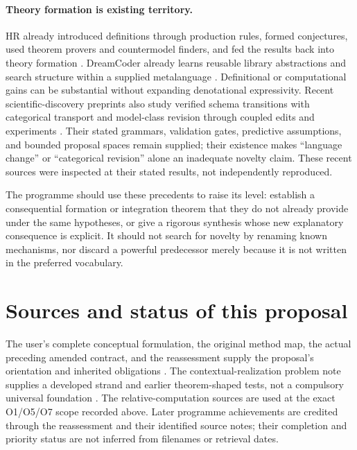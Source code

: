 \documentclass[11pt]{article}
\theoremstyle{definition}
\begin{document}
\paragraph{Theory formation is existing territory.}
HR already introduced definitions through production rules, formed conjectures, used theorem provers and countermodel finders, and fed the results back into theory formation \cite{HR}. DreamCoder already learns reusable library abstractions and search structure within a supplied metalanguage \cite{DreamCoder}. Definitional or computational gains can be substantial without expanding denotational expressivity. Recent scientific-discovery preprints also study verified schema transitions with categorical transport and model-class revision through coupled edits and experiments \cite{ScientificSchema,Outgrow}. Their stated grammars, validation gates, predictive assumptions, and bounded proposal spaces remain supplied; their existence makes ``language change'' or ``categorical revision'' alone an inadequate novelty claim. These recent sources were inspected at their stated results, not independently reproduced.

The programme should use these precedents to raise its level: establish a consequential formation or integration theorem that they do not already provide under the same hypotheses, or give a rigorous synthesis whose new explanatory consequence is explicit. It should not search for novelty by renaming known mechanisms, nor discard a powerful predecessor merely because it is not written in the preferred vocabulary.

\section{Sources and status of this proposal}
\label{app:sources}

The user's complete conceptual formulation, the original method map, the actual preceding amended contract, and the reassessment supply the proposal's orientation and inherited obligations \cite{Formulation,Map,Earlier,Reassessment}. The contextual-realization problem note supplies a developed strand and earlier theorem-shaped tests, not a compulsory universal foundation \cite{Problem}. The relative-computation sources are used at the exact O1/O5/O7 scope recorded above. Later programme achievements are credited through the reassessment and their identified source notes; their completion and priority status are not inferred from filenames or retrieval dates.
\end{document}
